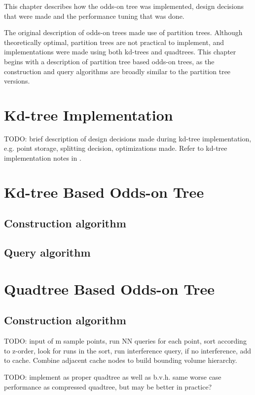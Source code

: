 \documentclass[mcs]{scsthesis}
\begin{document}
This chapter describes how the odds-on tree was implemented, design decisions
that were made and the performance tuning that was done.

The original description of odds-on trees made use of partition trees.  Although
theoretically optimal, partition trees are not practical to implement, and
implementations were made using both kd-trees and quadtrees.  This chapter
begins with a description of partition tree based odds-on trees, as the
construction and query algorithms are broadly similar to the partition tree
versions.

\section{Kd-tree Implementation}

TODO: brief description of design decisions made during kd-tree implementation,
e.g. point storage, splitting decision, optimizations made.   Refer to 
kd-tree implementation notes in \cite{physicallybasedrendering}.

\section{Kd-tree Based Odds-on Tree}

\subsection{Construction algorithm}

\subsection{Query algorithm}

\section{Quadtree Based Odds-on Tree}

\subsection{Construction algorithm}

TODO: input of m sample points, run NN queries for each point, sort according
to z-order, look for runs in the sort, run interference query, if no
interference, add to cache.  Combine adjacent cache nodes to build bounding
volume hierarchy.

TODO: implement as proper quadtree as well as b.v.h.  same worse case 
performance as compressed quadtree, but may be better in practice?
\end{document}
